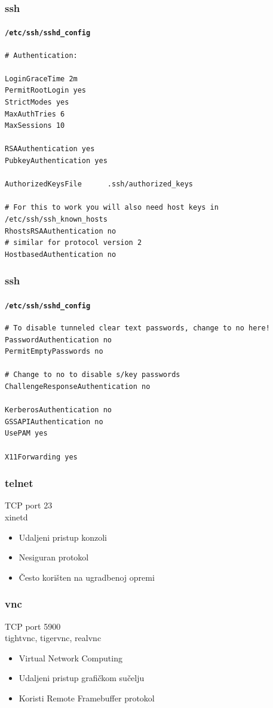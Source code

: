 \documentclass[t,table,usenames,dvipsnames]{beamer}
\begin{document}
\begin{frame}[fragile]
	\frametitle{ssh}
	\framesubtitle{\texttt{/etc/ssh/sshd\_config}}
	\scriptsize
	\begin{verbatim}
# Authentication:

LoginGraceTime 2m
PermitRootLogin yes
StrictModes yes
MaxAuthTries 6
MaxSessions 10

RSAAuthentication yes
PubkeyAuthentication yes

AuthorizedKeysFile      .ssh/authorized_keys

# For this to work you will also need host keys in /etc/ssh/ssh_known_hosts
RhostsRSAAuthentication no
# similar for protocol version 2
HostbasedAuthentication no
	\end{verbatim}

\end{frame}

\begin{frame}[fragile]
	\frametitle{ssh}
	\framesubtitle{\texttt{/etc/ssh/sshd\_config}}
	\scriptsize
	\begin{verbatim}
# To disable tunneled clear text passwords, change to no here!
PasswordAuthentication no
PermitEmptyPasswords no

# Change to no to disable s/key passwords
ChallengeResponseAuthentication no

KerberosAuthentication no
GSSAPIAuthentication no
UsePAM yes

X11Forwarding yes

	\end{verbatim}

\end{frame}






\begin{frame}
	\frametitle{telnet}

	TCP port 23\\
	xinetd
	
	\begin{itemize}
		\item Udaljeni pristup konzoli
		\item Nesiguran protokol
		
		\item Često korišten na ugradbenoj opremi
	\end{itemize}
\end{frame}


\begin{frame}
	\frametitle{vnc}

	TCP port 5900\\
	tightvnc, tigervnc, realvnc

	\begin{itemize}
		\item Virtual Network Computing
		\item Udaljeni pristup grafičkom sučelju
		
		\item Koristi Remote Framebuffer protokol
	\end{itemize}
\end{frame}
\end{document}

